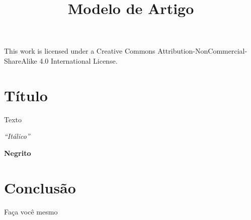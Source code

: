\documentclass{article}
\begin{document}
This work is licensed under a Creative Commons Attribution-NonCommercial-ShareAlike 4.0 International License.

\title{Modelo de Artigo}

\section{Título}

Texto

\textit{“Itálico”}

\textbf{Negrito}

\section{Conclusão}

Faça você mesmo
\end{document}
